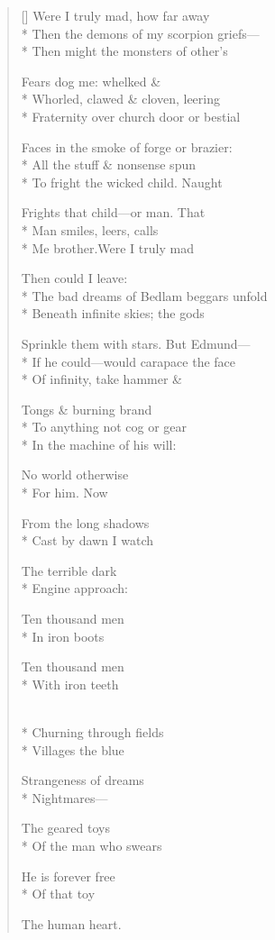 \label{ch:lear_ap}
\settowidth{\versewidth}{Sprinkle them with stars.   But Edmund---}
\begin{verse}[\versewidth]
Were I truly mad, how far away\\*
Then the demons of my scorpion griefs---\\*
Then might the monsters of other's

Fears dog me: whelked \&\\*
Whorled, clawed \& cloven, leering\\*
Fraternity over church door or bestial

Faces in the smoke of forge or brazier:\\*
All the stuff \& nonsense spun\\*
To fright the wicked child.   Naught

Frights that child---or man.   That\\*
Man smiles, leers, calls\\*
Me brother.\qquad Were I truly mad

Then could I leave:\\*
The bad dreams of Bedlam beggars unfold\\*
Beneath infinite skies; the gods

Sprinkle them with stars.   But Edmund---\\*
If he could---would carapace the face\\*
Of infinity, take hammer \&

Tongs \& burning brand\\*
To anything not cog or gear\\*
In the machine of his will:

No world otherwise\\*
For him.\hspace*{3\vgap} Now

From the long shadows\\*
Cast by dawn I watch

The terrible dark\\*
Engine approach:

Ten thousand men\\*
In iron boots

Ten thousand men\\*
With iron teeth

\\*
Churning through fields\\*
Villages\hspace*{3\vgap} the blue

Strangeness of dreams\\*
Nightmares---

The geared toys\\*
Of the man who swears

He is forever free\\*
Of that toy

The human heart.
\end{verse}

